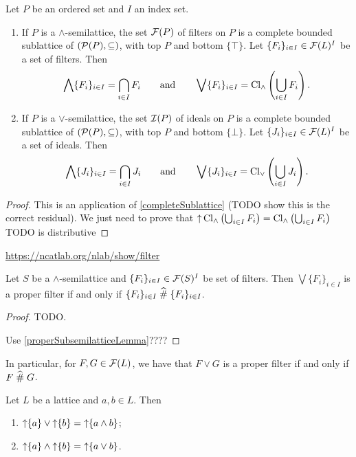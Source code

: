 \begin{proposition} \label{latticeFiltersIdeals}
Let $P$ be an ordered set and $I$ an index set.
\begin{enumerate}
\item If $P$ is a $\wedge$-semilattice, the set $\operatorname{\mathcal{F}}(P)$ of filters on $P$ is a complete bounded sublattice of $\left( \operatorname{\mathcal{P}}(P), \subseteq \right)$, with top $P$ and bottom $\{\top\}$. Let $\{F_i\}_{i\in I} \in \operatorname{\mathcal{F}}(L)^I$ be a set of filters. Then
\[ \bigwedge \{F_i\}_{i\in I} = \bigcap_{i\in I}F_i \qquad\text{and}\qquad
\bigvee \{F_i\}_{i\in I} =  \operatorname{Cl}_\wedge\left(\bigcup_{i\in I}F_i\right). \]
\item If $P$ is a $\vee$-semilattice, the set $\operatorname{\mathcal{I}}(P)$ of ideals on $P$ is a complete bounded sublattice of $\left( \operatorname{\mathcal{P}}(P), \subseteq \right)$, with top $P$ and bottom $\{\bot\}$. Let $\{J_i\}_{i\in I} \in \operatorname{\mathcal{F}}(L)^I$ be a set of ideals. Then
\[ \bigwedge \{J_i\}_{i\in I} = \bigcap_{i\in I}J_i \qquad\text{and}\qquad
\bigvee \{J_i\}_{i\in I} =  \operatorname{Cl}_\vee\left(\bigcup_{i\in I}J_i\right). \]
\end{enumerate}
\end{proposition}
\begin{proof}
This is an application of \ref{completeSublattice} (TODO show this is the correct residual). We just need to prove that $\operatorname{\uparrow}\operatorname{Cl}_\wedge \left(\bigcup_{i\in I}F_i\right) = \operatorname{Cl}_\wedge \left(\bigcup_{i\in I}F_i\right)$ TODO is distributive
\end{proof}
\url{https://ncatlab.org/nlab/show/filter}

\begin{proposition} \label{joinProperFilter}
Let $S$ be a $\wedge$-semilattice and $\{F_i\}_{i\in I} \in \operatorname{\mathcal{F}}(S)^I$ be set of filters. Then $\bigvee \{F_i\}_{i\in I}$ is a proper filter \textup{if and only if} $\{F_i\}_{i\in I}\mathrel{\widehat{\#}} \{F_i\}_{i\in I}$.
\end{proposition}
\begin{proof}
TODO.

Use \ref{properSubsemilatticeLemma}????
\end{proof}
In particular, for $F, G\in\operatorname{\mathcal{F}}(L)$, we have that $F\vee G$ is a proper filter if and only if $F\mathrel{\widehat{\#}} G$.

\begin{lemma}
Let $L$ be a lattice and $a,b\in L$. Then
\begin{enumerate}
\item $\operatorname{\uparrow}\{a\} \vee \operatorname{\uparrow}\{b\} = \operatorname{\uparrow}\{a\wedge b\}$;
\item $\operatorname{\uparrow}\{a\} \wedge \operatorname{\uparrow}\{b\} = \operatorname{\uparrow}\{a\vee b\}$.
\end{enumerate}
\end{lemma}

